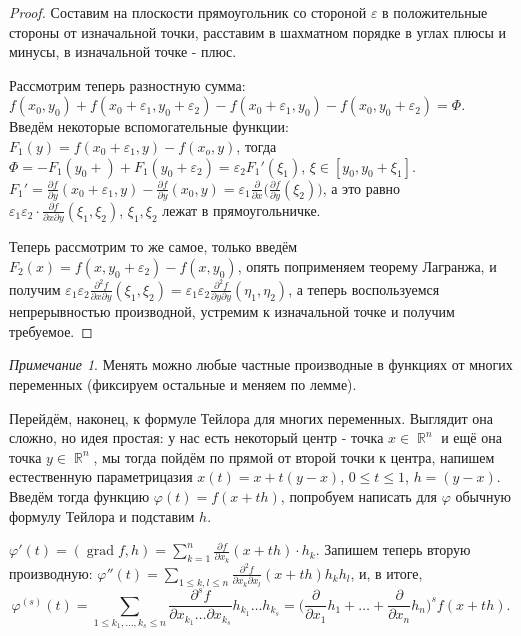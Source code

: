 \documentclass[a4paper,100pt]{article}
\theoremstyle{indented}
\theoremstyle{definition}
\theoremstyle{remark}
\newtheorem{remark}{Примечание}
\DeclareMathOperator{\RR}{\mathbb{R}}
\DeclareMathOperator{\grad}{grad}
\begin{document}
\begin{proof}
    Составим на плоскости прямоугольник со стороной $\varepsilon $ в положительные стороны от изначальной точки, расставим в шахматном порядке в углах плюсы и минусы, в изначальной точке - плюс. \ 

    Рассмотрим теперь разностную сумма: $f(x_0, y_0)+f(x_0+\varepsilon_1, y_0+\varepsilon_2)-f(x_0+\varepsilon_1, y_0)- f(x_0, y_0+\varepsilon_2)= \Phi$. Введём некоторые вспомогательные функции: $F_1(y)=f(x_0+\varepsilon_1, y)-f(x_o, y)$, тогда $\Phi=-F_1(y_0+)+F_1(y_0+\varepsilon_2)= \varepsilon_2F_1'(\xi_1)$, $\xi\in[y_0, y_0+\xi_1]$. $F_1'=\frac{\partial f}{\partial y}(x_0+\varepsilon_1, y)-\frac{\partial f}{\partial y}(x_0, y)= \varepsilon_1\frac{\partial}{\partial x}\biggl(\frac{\partial f}{\partial y}(\xi_2)\biggr)$, а это равно $\varepsilon_1\varepsilon_2\cdot\frac{\partial f}{\partial x\partial y}(\xi_1, \xi_2)$, $\xi_1, \xi_2$ лежат в прямоугольничке. \ 

    Теперь рассмотрим то же самое, только введём $F_2(x)=f(x, y_0+\varepsilon_2)-f(x, y_0)$, опять поприменяем теорему Лагранжа, и получим $\varepsilon_1\varepsilon_2\frac{\partial^2 f}{\partial x \partial y}(\xi_1, \xi_2)=\varepsilon_1\varepsilon_2\frac{\partial^2 f}{\partial y \partial y}(\eta_1, \eta_2)$, а теперь воспользуемся непрерывностью производной, устремим к изначальной точке и получим требуемое.
\end{proof}

\begin{remark}
    Менять можно любые частные производные в функциях от многих переменных (фиксируем остальные и меняем по лемме).
\end{remark}

Перейдём, наконец, к формуле Тейлора для многих переменных. Выглядит она сложно, но идея простая: у нас есть некоторый центр - точка $x\in\RR^n$ и ещё она точка $y\in\RR^n$, мы тогда пойдём по прямой от второй точки к центра, напишем естественную параметрицазия $x(t)=x+t(y-x)$, $0\leq t\leq 1$, $h=(y-x)$. Введём тогда функцию $\varphi(t)=f(x+th)$, попробуем написать для $\varphi$ обычную формулу Тейлора и подставим $h$. \ 

$\varphi'(t)=(\grad f, h)=\sum_{k=1}^n\frac{\partial f}{\partial x_k}(x+th)\cdot h_k$. Запишем теперь вторую производную: $\varphi''(t)=\sum_{1\leq k, l\leq n}\frac{\partial ^2 f}{\partial x_k\partial x_l}(x+th)h_kh_l$, и, в итоге, 
\[
    \varphi^{(s)}(t)=\sum_{1\leq k_1, \ldots, k_s\leq n}\frac{\partial^s f}{\partial x_{k_1}\ldots \partial x_{k_s}}h_{k_1}\dots h_{k_s} = \biggl(\frac{\partial}{\partial x_1}h_1+\ldots+\frac{\partial}{\partial x_n}h_n\biggr)^s f(x+th). 
\]
\end{document}

